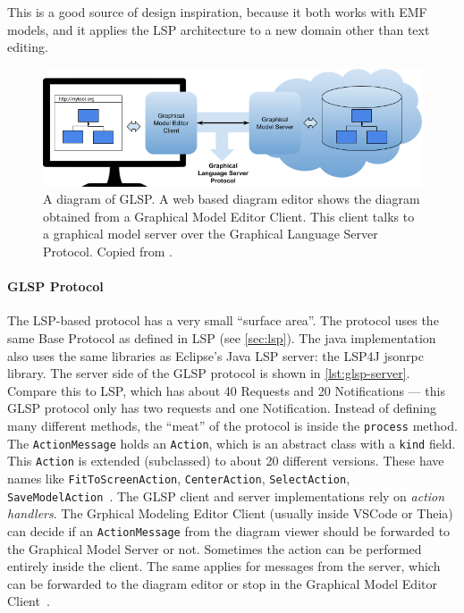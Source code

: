This is a good source of design inspiration, because it both works with \acrshort{EMF} models, and it applies the \acrlong{LSP} architecture to a new domain other than text editing.

\begin{figure}[htbp]  %
  \centering
  \includegraphics[width=\textwidth]{figures/pre-project/glsp-overview.png}
  \caption[GLSP Overview]{A diagram of GLSP. A web based diagram editor shows the diagram obtained from a Graphical Model Editor Client. This client talks to a graphical model server over the Graphical Language Server Protocol. Copied from \cite{eclipsefoundationGLSP2020}.}\label{fig:glsp-overview}
\end{figure}

\paragraph{GLSP Protocol}\label{par:glsp-actionmessage}
The \acrshort{LSP}-based protocol has a very small ``surface area''.
The protocol uses the same Base Protocol as defined in \acrshort{LSP} (see \cref{sec:lsp}).
The java implementation also uses the same libraries as Eclipse's Java \acrshort{LSP} server: the LSP4J jsonrpc library.
The server side of the GLSP protocol is shown in \cref{lst:glsp-server}.
Compare this to \acrshort{LSP}, which has about 40 Requests and 20 Notifications --- this GLSP protocol only has two requests and one Notification.
Instead of defining many different methods, the ``meat'' of the protocol is inside the \texttt{process} method.
The \texttt{ActionMessage} holds an \texttt{Action}, which is an abstract class with a \texttt{kind} field.
This \texttt{Action} is extended (subclassed) to about 20 different versions.
These have names like \texttt{FitToScreenAction}, \texttt{CenterAction}, \texttt{SelectAction}, \texttt{SaveModelAction}~\cite{tobiasortmayrEclipseglspGlspserverActions2021}.
The GLSP client and server implementations rely on \textit{action handlers}.
The Grphical Modeling Editor Client (usually inside \gls{VSCode} or \gls{Theia}) can decide if an \texttt{ActionMessage} from the diagram viewer should be forwarded to the Graphical Model Server or not.
Sometimes the action can be performed entirely inside the client.
The same applies for messages from the server, which can be forwarded to the diagram editor or stop in the Graphical Model Editor Client~\cite{tobiasortmayrEclipseglspGlspvscodeintegration2021}.


